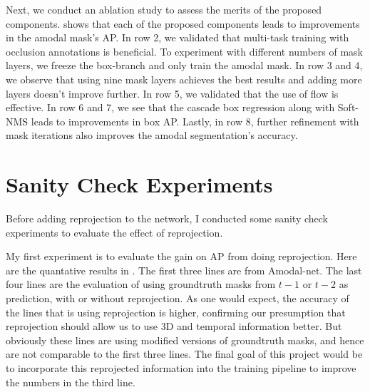 Next, we conduct an ablation study to assess the merits of the proposed components.   shows that each of the proposed components leads to improvements in the amodal mask's AP.
In row 2, we validated that multi-task training with occlusion annotations is beneficial. 
To experiment with different numbers of mask layers, we freeze the box-branch and only train the amodal mask.
In row 3 and 4, we observe that using nine mask layers achieves the best results and adding more layers doesn't improve further. In row 5, we validated that the use of flow is effective. 
In row 6 and 7, we see that the cascade box regression along with Soft-NMS leads to improvements in box AP. Lastly, in row 8, further refinement with mask iterations also improves the amodal segmentation's accuracy.





\section{Sanity Check Experiments}
Before adding reprojection to the network, I conducted some sanity check experiments to evaluate the effect of reprojection. 

My first experiment is to evaluate the gain on AP from doing reprojection. Here are the quantative results in . The first three lines are from Amodal-net. The last four lines are the evaluation of using groundtruth masks from $t-1$ or $t-2$ as prediction, with or without reprojection. As one would expect, the accuracy of the lines that is using reprojection is higher, confirming our presumption that reprojection should allow us to use 3D and temporal information better. But obviously these lines are using modified versions of groundtruth masks, and hence are not comparable to the first three lines. The final goal of this project would be to incorporate this reprojected information into the training pipeline to improve the numbers in the third line.

